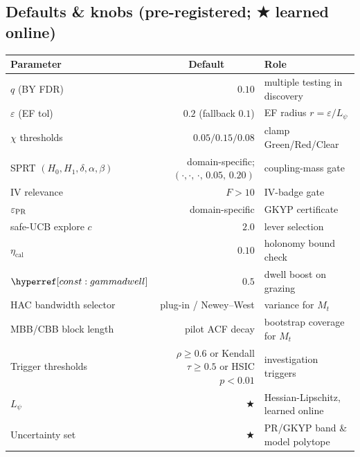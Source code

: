 \subsection*{Defaults \& knobs (pre-registered; ★ learned online)}\label{subsec:ops-defaults}
\emph{}
\begin{center}
\renewcommand{\arraystretch}{1.15}
\begin{tabular}{l r l}
\toprule
Parameter & \multicolumn{1}{c}{Default} & Role \\
\midrule
$q$ (BY FDR) & $0.10$ & multiple testing in discovery \\
$\varepsilon$ (EF tol) & $0.2$ (fallback $0.1$) & EF radius $r=\varepsilon/L_\psi$ \\
$\chi$ thresholds & $0.05/0.15/0.08$ & clamp Green/Red/Clear \\
SPRT $(H_0,H_1,\delta,\alpha,\beta)$ & domain-specific; $(\cdot,\cdot,\,\cdot,\,0.05,\,\mathbf{0.20})$ & coupling-mass gate \\
IV relevance & $F>10$ & IV-badge gate \\
$\varepsilon_{\mathrm{PR}}$ & domain-specific & GKYP certificate \\
safe-UCB explore $c$ & $2.0$ & lever selection \\
$\eta_{\mathrm{cal}}$ & $0.10$ & holonomy bound check \\
$\constref{gammadwell}$ & $0.5$ & dwell boost on grazing \\
HAC bandwidth selector & plug-in / Newey–West & variance for $M_t$ \\
MBB/CBB block length & pilot ACF decay & bootstrap coverage for $M_t$ \\
Trigger thresholds & $\rho\!\ge\!0.6$ or Kendall $\tau\!\ge\!0.5$ or HSIC $p<0.01$ & investigation triggers \\
$L_\psi$ & ★ & Hessian-Lipschitz, learned online \\
Uncertainty set & ★ & PR/GKYP band \& model polytope \\
\bottomrule
\end{tabular}
\end{center}

